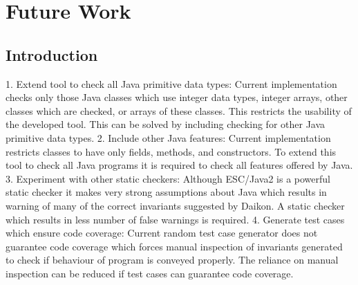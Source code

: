 
\chapter{Future Work}
\label{chap:futureWork}

\section{Introduction}\label{sec:intro8}
	
1. Extend tool to check all Java primitive data types: Current implementation checks only those Java classes which use integer data types, integer arrays, other classes which are checked, or arrays of these classes. This restricts the usability of the developed tool. This can be solved by including checking for other Java primitive data types. 2. Include other Java features: Current implementation restricts classes to have only fields, methods, and constructors. To extend this tool to check all Java programs it is required to check all features offered by Java. 3. Experiment with other static checkers: Although ESC/Java2 is a powerful static checker it makes very strong assumptions about Java which results in warning of many of the correct invariants suggested by Daikon. A static checker which results in less number of false warnings is required. 4. Generate test cases which ensure code coverage: Current random test case generator does not guarantee code coverage which forces manual inspection of invariants generated to check if behaviour of program is conveyed properly. The reliance on manual inspection can be reduced if test cases can guarantee code coverage.



